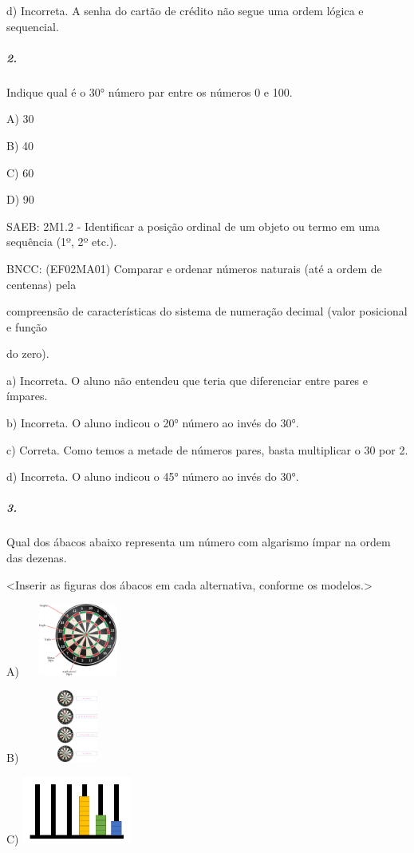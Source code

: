 d) Incorreta. A senha do cartão de crédito não segue uma ordem lógica e
sequencial.

\subparagraph{2. }\label{section-12}

Indique qual é o 30° número par entre os números 0 e 100.

A) 30

B) 40

C) 60

D) 90

SAEB: 2M1.2 - Identificar a posição ordinal de um objeto ou termo em uma
sequência (1º, 2º etc.).

BNCC: (EF02MA01) Comparar e ordenar números naturais (até a ordem de
centenas) pela

compreensão de características do sistema de numeração decimal (valor
posicional e função

do zero).

a) Incorreta. O aluno não entendeu que teria que diferenciar entre pares
e ímpares.

b) Incorreta. O aluno indicou o 20° número ao invés do 30°.

c) Correta. Como temos a metade de números pares, basta multiplicar o 30
por 2.

d) Incorreta. O aluno indicou o 45° número ao invés do 30°.

\subparagraph{3. }\label{section-13}

Qual dos ábacos abaixo representa um número com algarismo ímpar na ordem
das dezenas.

\textless{}Inserir as figuras dos ábacos em cada alternativa, conforme
os modelos.\textgreater{}

A) \includegraphics[width=1.42708in,height=0.93377in]{media/image24.png}

B) \includegraphics[width=1.43685in,height=0.93657in]{media/image25.png}

C) \includegraphics[width=1.41667in,height=0.86777in]{media/image26.png}

